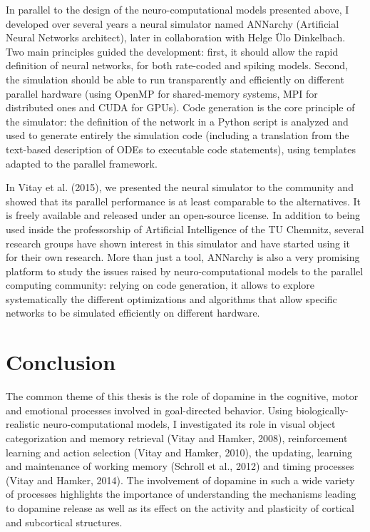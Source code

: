 \documentclass[
  11pt,
  a4paper,
]{scrbook}
\begin{document}
In parallel to the design of the neuro-computational models presented
above, I developed over several years a neural simulator named ANNarchy
(Artificial Neural Networks architect), later in collaboration with
Helge Ülo Dinkelbach. Two main principles guided the development: first,
it should allow the rapid definition of neural networks, for both
rate-coded and spiking models. Second, the simulation should be able to
run transparently and efficiently on different parallel hardware (using
OpenMP for shared-memory systems, MPI for distributed ones and CUDA for
GPUs). Code generation is the core principle of the simulator: the
definition of the network in a Python script is analyzed and used to
generate entirely the simulation code (including a translation from the
text-based description of ODEs to executable code statements), using
templates adapted to the parallel framework.

In Vitay et al. (2015), we presented the neural simulator to the
community and showed that its parallel performance is at least
comparable to the alternatives. It is freely available and released
under an open-source license. In addition to being used inside the
professorship of Artificial Intelligence of the TU Chemnitz, several
research groups have shown interest in this simulator and have started
using it for their own research. More than just a tool, ANNarchy is also
a very promising platform to study the issues raised by
neuro-computational models to the parallel computing community: relying
on code generation, it allows to explore systematically the different
optimizations and algorithms that allow specific networks to be
simulated efficiently on different hardware.

\section{Conclusion}\label{conclusion}

The common theme of this thesis is the role of dopamine in the
cognitive, motor and emotional processes involved in goal-directed
behavior. Using biologically-realistic neuro-computational models, I
investigated its role in visual object categorization and memory
retrieval (Vitay and Hamker, 2008), reinforcement learning and action
selection (Vitay and Hamker, 2010), the updating, learning and
maintenance of working memory (Schroll et al., 2012) and timing
processes (Vitay and Hamker, 2014). The involvement of dopamine in such
a wide variety of processes highlights the importance of understanding
the mechanisms leading to dopamine release as well as its effect on the
activity and plasticity of cortical and subcortical structures.
\end{document}
